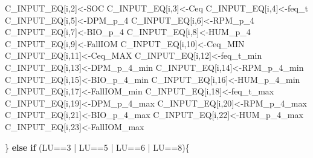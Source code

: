 \documentclass[
  10pt,
  b5paper,
]{book}
\newenvironment{Shaded}{\begin{snugshade}}{\end{snugshade}}
\newcommand{\ControlFlowTok}[1]{\textcolor[rgb]{0.13,0.29,0.53}{\textbf{#1}}}
\newcommand{\DecValTok}[1]{\textcolor[rgb]{0.00,0.00,0.81}{#1}}
\newcommand{\NormalTok}[1]{#1}
\newcommand{\OtherTok}[1]{\textcolor[rgb]{0.56,0.35,0.01}{#1}}
\newcommand{\SpecialCharTok}[1]{\textcolor[rgb]{0.00,0.00,0.00}{#1}}
\begin{document}
\begin{Shaded}
\begin{Highlighting}[]
\NormalTok{C\_INPUT\_EQ[i,}\DecValTok{2}\NormalTok{]}\OtherTok{\textless{}{-}}\NormalTok{SOC}
\NormalTok{C\_INPUT\_EQ[i,}\DecValTok{3}\NormalTok{]}\OtherTok{\textless{}{-}}\NormalTok{Ceq}
\NormalTok{C\_INPUT\_EQ[i,}\DecValTok{4}\NormalTok{]}\OtherTok{\textless{}{-}}\NormalTok{feq\_t}
\NormalTok{C\_INPUT\_EQ[i,}\DecValTok{5}\NormalTok{]}\OtherTok{\textless{}{-}}\NormalTok{DPM\_p\_4}
\NormalTok{C\_INPUT\_EQ[i,}\DecValTok{6}\NormalTok{]}\OtherTok{\textless{}{-}}\NormalTok{RPM\_p\_4}
\NormalTok{C\_INPUT\_EQ[i,}\DecValTok{7}\NormalTok{]}\OtherTok{\textless{}{-}}\NormalTok{BIO\_p\_4}
\NormalTok{C\_INPUT\_EQ[i,}\DecValTok{8}\NormalTok{]}\OtherTok{\textless{}{-}}\NormalTok{HUM\_p\_4}
\NormalTok{C\_INPUT\_EQ[i,}\DecValTok{9}\NormalTok{]}\OtherTok{\textless{}{-}}\NormalTok{FallIOM}
\NormalTok{C\_INPUT\_EQ[i,}\DecValTok{10}\NormalTok{]}\OtherTok{\textless{}{-}}\NormalTok{Ceq\_MIN}
\NormalTok{C\_INPUT\_EQ[i,}\DecValTok{11}\NormalTok{]}\OtherTok{\textless{}{-}}\NormalTok{Ceq\_MAX}
\NormalTok{C\_INPUT\_EQ[i,}\DecValTok{12}\NormalTok{]}\OtherTok{\textless{}{-}}\NormalTok{feq\_t\_min}
\NormalTok{C\_INPUT\_EQ[i,}\DecValTok{13}\NormalTok{]}\OtherTok{\textless{}{-}}\NormalTok{DPM\_p\_4\_min}
\NormalTok{C\_INPUT\_EQ[i,}\DecValTok{14}\NormalTok{]}\OtherTok{\textless{}{-}}\NormalTok{RPM\_p\_4\_min}
\NormalTok{C\_INPUT\_EQ[i,}\DecValTok{15}\NormalTok{]}\OtherTok{\textless{}{-}}\NormalTok{BIO\_p\_4\_min}
\NormalTok{C\_INPUT\_EQ[i,}\DecValTok{16}\NormalTok{]}\OtherTok{\textless{}{-}}\NormalTok{HUM\_p\_4\_min}
\NormalTok{C\_INPUT\_EQ[i,}\DecValTok{17}\NormalTok{]}\OtherTok{\textless{}{-}}\NormalTok{FallIOM\_min}
\NormalTok{C\_INPUT\_EQ[i,}\DecValTok{18}\NormalTok{]}\OtherTok{\textless{}{-}}\NormalTok{feq\_t\_max}
\NormalTok{C\_INPUT\_EQ[i,}\DecValTok{19}\NormalTok{]}\OtherTok{\textless{}{-}}\NormalTok{DPM\_p\_4\_max}
\NormalTok{C\_INPUT\_EQ[i,}\DecValTok{20}\NormalTok{]}\OtherTok{\textless{}{-}}\NormalTok{RPM\_p\_4\_max}
\NormalTok{C\_INPUT\_EQ[i,}\DecValTok{21}\NormalTok{]}\OtherTok{\textless{}{-}}\NormalTok{BIO\_p\_4\_max}
\NormalTok{C\_INPUT\_EQ[i,}\DecValTok{22}\NormalTok{]}\OtherTok{\textless{}{-}}\NormalTok{HUM\_p\_4\_max}
\NormalTok{C\_INPUT\_EQ[i,}\DecValTok{23}\NormalTok{]}\OtherTok{\textless{}{-}}\NormalTok{FallIOM\_max}

\NormalTok{\} }\ControlFlowTok{else} \ControlFlowTok{if}\NormalTok{ (LU}\SpecialCharTok{==}\DecValTok{3} \SpecialCharTok{|}\NormalTok{ LU}\SpecialCharTok{==}\DecValTok{5} \SpecialCharTok{|}\NormalTok{ LU}\SpecialCharTok{==}\DecValTok{6} \SpecialCharTok{|}\NormalTok{ LU}\SpecialCharTok{==}\DecValTok{8}\NormalTok{)\{}


\end{Highlighting}
\end{Shaded}
\end{document}
